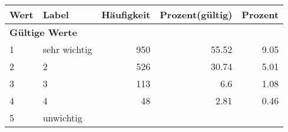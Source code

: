      \begin{longtable}{lXrrr}
     \toprule
     \textbf{Wert} & \textbf{Label} & \textbf{Häufigkeit} & \textbf{Prozent(gültig)} & \textbf{Prozent} \\
     \endhead
     \midrule
     \multicolumn{5}{l}{\textbf{Gültige Werte}}\\

     1 &
     \multicolumn{1}{X}{ sehr wichtig   } &


       \num{950} &
       \num[round-mode=places,round-precision=2]{55.52} &
         \num[round-mode=places,round-precision=2]{9.05} \\

     2 &
     \multicolumn{1}{X}{ 2   } &


       \num{526} &
       \num[round-mode=places,round-precision=2]{30.74} &
         \num[round-mode=places,round-precision=2]{5.01} \\

     3 &
     \multicolumn{1}{X}{ 3   } &


       \num{113} &
       \num[round-mode=places,round-precision=2]{6.6} &
         \num[round-mode=places,round-precision=2]{1.08} \\

     4 &
     \multicolumn{1}{X}{ 4   } &


       \num{48} &
       \num[round-mode=places,round-precision=2]{2.81} &
         \num[round-mode=places,round-precision=2]{0.46} \\

     5 &
     \multicolumn{1}{X}{ unwichtig   } &



\end{longtable}
